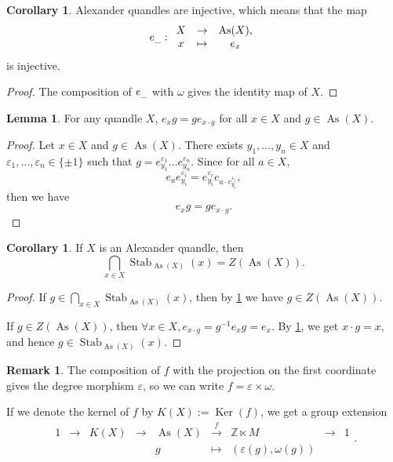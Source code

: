 \documentclass[a4paper,11pt]{amsart}
\theoremstyle{definition}
\newtheorem{lem}[thm]{Lemma}
\newtheorem{cor}[thm]{Corollary}
\newtheorem{rem}[thm]{Remark}
\newcommand{\Z}{{\mathbb Z}}
\DeclareMathOperator{\Ker}{Ker}
\DeclareMathOperator{\Stab}{Stab}
\DeclareMathOperator{\As}{As}
\begin{document}
\begin{cor}\label{cor:injectivity}
Alexander quandles are injective, which means that the map
\[e_{\text{\textunderscore}} :\begin{array}{ccc}
X & \to & \As(X), \\
x & \mapsto & e_x
\end{array}
\]
is injective.
\end{cor}

\begin{proof} The composition of $e_{\text{\textunderscore}}$ with $\omega$ gives the identity map of $X$.
\end{proof}

\begin{lem}\label{lem:conjg}
For any quandle $X$, $e_x g = g e_{x \cdot g}$ for all $x\in X$ and $g\in \As(X)$.
\end{lem}

\begin{proof}
Let $x\in X$ and $g\in \As(X)$.
There exists $y_1,\ldots, y_n\in X$ and $\varepsilon_1,\ldots, \varepsilon_n\in \{\pm 1\}$ such that $g=e_{y_1}^{\varepsilon_1} \ldots e_{y_n}^{\varepsilon_n}$.
Since for all $a\in X$,
\[
e_a e_{y_i}^{\varepsilon_i} = e_{y_i}^{\varepsilon_i} e_{a\cdot e_{y_i}^{\varepsilon_i}},
\]
then we have
\[
e_x g = g e_{x\cdot g}.
\]
\end{proof}

\begin{cor}\label{cor:centerofas}
If $X$ is an Alexander quandle, then
\[
\bigcap_{x\in X} \Stab_{\As(X)}(x) = Z(\As(X)).
\]
\end{cor}

\begin{proof}
If $g\in \bigcap\limits_{x\in X} \Stab_{\As(X)}(x)$, then by \cref{lem:conjg} we have $g\in Z(\As(X))$.

If $g\in Z(\As(X))$, then $\forall x \in X, e_{x\cdot g} = g^{-1} e_x g = e_x$.
By \cref{cor:injectivity}, we get $x \cdot g = x$, and hence $g\in \Stab_{\As(X)}(x)$.
\end{proof}

\begin{rem}
The composition of $f$ with the projection on the first coordinate gives the degree morphism $\varepsilon$, so we can write $f=\varepsilon\times \omega$.
\end{rem}

If we denote the kernel of $f$ by $K(X):= \Ker(f)$, we get a group extension
\begin{equation} \label{extension} \tag{E}
\begin{array}{ccccccccc}
1 & \longrightarrow & K(X) & \longrightarrow & \As(X) & \overset{f}{\longrightarrow} & \Z \ltimes M & \longrightarrow & 1\\
& & & & g & \longmapsto & \left(\varepsilon(g),\omega(g) \right) & &
\end{array}.
\end{equation}
\end{document}
